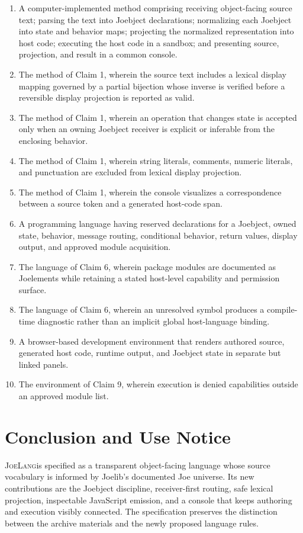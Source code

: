 \documentclass[12pt]{article}
\newcommand{\JoeLang}{\textsc{JoeLang}}
\begin{document}
\begin{enumerate}[label=\textbf{Claim \arabic*.},leftmargin=1.35cm]
  \item A computer-implemented method comprising receiving object-facing source text; parsing the text into Joebject declarations; normalizing each Joebject into state and behavior maps; projecting the normalized representation into host code; executing the host code in a sandbox; and presenting source, projection, and result in a common console.
  \item The method of Claim 1, wherein the source text includes a lexical display mapping governed by a partial bijection whose inverse is verified before a reversible display projection is reported as valid.
  \item The method of Claim 1, wherein an operation that changes state is accepted only when an owning Joebject receiver is explicit or inferable from the enclosing behavior.
  \item The method of Claim 1, wherein string literals, comments, numeric literals, and punctuation are excluded from lexical display projection.
  \item The method of Claim 1, wherein the console visualizes a correspondence between a source token and a generated host-code span.
  \item A programming language having reserved declarations for a Joebject, owned state, behavior, message routing, conditional behavior, return values, display output, and approved module acquisition.
  \item The language of Claim 6, wherein package modules are documented as Joelements while retaining a stated host-level capability and permission surface.
  \item The language of Claim 6, wherein an unresolved symbol produces a compile-time diagnostic rather than an implicit global host-language binding.
  \item A browser-based development environment that renders authored source, generated host code, runtime output, and Joebject state in separate but linked panels.
  \item The environment of Claim 9, wherein execution is denied capabilities outside an approved module list.
\end{enumerate}

\clearpage
\section{Conclusion and Use Notice}
\JoeLang is specified as a transparent object-facing language whose source vocabulary is informed by Joelib's documented Joe universe. Its new contributions are the Joebject discipline, receiver-first routing, safe lexical projection, inspectable JavaScript emission, and a console that keeps authoring and execution visibly connected. The specification preserves the distinction between the archive materials and the newly proposed language rules.
\end{document}
